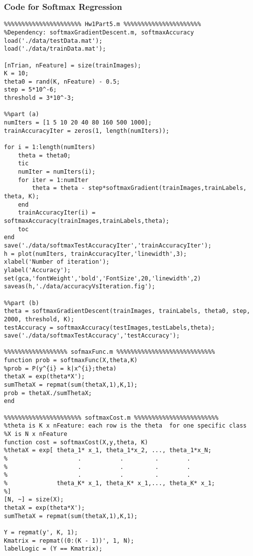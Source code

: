 \documentclass[12pt]{article} %
\theoremstyle{definition}\newtheorem{law}{Law}
\theoremstyle{plain}\newtheorem{jury}[law]{Jury}
\theoremstyle{remark}\newtheorem{juu}{Juu}
\theoremstyle{definition}\newtheorem{kuu}[law]{Kuu}
\theoremstyle{definition}\newtheorem{muu}{Muu}[section]
\theoremstyle{definition}\newtheorem{honoluu}{Honoluu}[section]
\theoremstyle{definition}\newtheorem{konoluu}[muu]{Konoluu}
\begin{document}
\subsubsection{Code for Softmax Regression}
\begin{lstlisting}
%%%%%%%%%%%%%%%%%%%%%% Hw1Part5.m %%%%%%%%%%%%%%%%%%%%%%
%Dependency: softmaxGradientDescent.m, softmaxAccuracy
load('./data/testData.mat');
load('./data/trainData.mat');

[nTrian, nFeature] = size(trainImages);
K = 10;
theta0 = rand(K, nFeature) - 0.5;
step = 5*10^-6;
threshold = 3*10^-3;

%%part (a)
numIters = [1 5 10 20 40 80 160 500 1000];
trainAccuracyIter = zeros(1, length(numIters));

for i = 1:length(numIters)
    theta = theta0;
    tic
    numIter = numIters(i);  
    for iter = 1:numIter
        theta = theta - step*softmaxGradient(trainImages,trainLabels, theta, K);
    end
    trainAccuracyIter(i) = softmaxAccuracy(trainImages,trainLabels,theta);
    toc
end
save('./data/softmaxTestAccuracyIter','trainAccuracyIter');
h = plot(numIters, trainAccuracyIter,'linewidth',3);
xlabel('Number of iteration');
ylabel('Accuracy');
set(gca,'fontWeight','bold','FontSize',20,'linewidth',2)
saveas(h,'./data/accuracyVsIteration.fig');

%%part (b)
theta = softmaxGradientDescent(trainImages, trainLabels, theta0, step, 2000, threshold, K);
testAccuracy = softmaxAccuracy(testImages,testLabels,theta);
save('./data/softmaxTestAccuracy','testAccuracy');

%%%%%%%%%%%%%%%%%% sofmaxFunc.m %%%%%%%%%%%%%%%%%%%%%%%%%%%%
function prob = softmaxFunc(X,theta,K)
%prob = P(y^{i} = k|x^{i};theta)                  
thetaX = exp(theta*X');
sumThetaX = repmat(sum(thetaX,1),K,1);
prob = thetaX./sumThetaX;
end

%%%%%%%%%%%%%%%%%%%%%% softmaxCost.m %%%%%%%%%%%%%%%%%%%%%%%%
%theta is K x nFeature: each row is the theta  for one specific class
%X is N x nFeature 
function cost = softmaxCost(X,y,theta, K)
%thetaX = exp[ theta_1* x_1, theta_1*x_2, ..., theta_1*x_N;
%                    .           .         .        .
%                    .           .         .        .
%                    .           .         .        .
%              theta_K* x_1, theta_K* x_1,..., theta_K* x_1;
%]
[N, ~] = size(X);                  
thetaX = exp(theta*X');
sumThetaX = repmat(sum(thetaX,1),K,1);

Y = repmat(y', K, 1);
Kmatrix = repmat((0:(K - 1))', 1, N);
labelLogic = (Y == Kmatrix);


\end{lstlisting}
\end{document}
